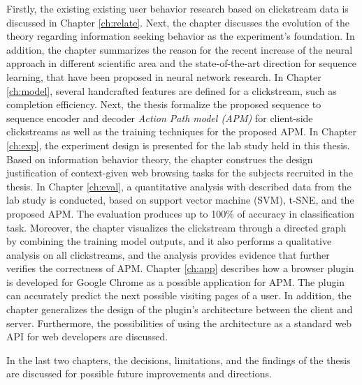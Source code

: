 Firstly, the existing existing user behavior research based on clickstream data is discussed in Chapter \ref{ch:relate}.
Next, the chapter discusses the evolution of the theory regarding information seeking behavior 
as the experiment's foundation.
In addition, the chapter summarizes the reason for the recent increase of the neural approach 
in different scientific area and the state-of-the-art direction for sequence learning, 
that have been proposed in neural network research.
In Chapter \ref{ch:model}, several handcrafted features are defined for a clickstream,
such as completion efficiency. Next, the thesis
formalize the proposed sequence to sequence encoder and decoder \emph{Action Path model (APM)} 
for client-side clickstreams as well as the training techniques for the proposed APM.
In Chapter \ref{ch:exp}, the experiment design is presented for the lab study held in this thesis.
Based on information behavior theory, the chapter construes the design justification 
of context-given web browsing tasks for the subjects recruited in the thesis.
In Chapter \ref{ch:eval},
a quantitative analysis with described data from the lab study is conducted, based on support
vector machine (SVM), t-SNE, and the proposed APM.
The evaluation produces up to 100\% of accuracy in classification task.
Moreover, the chapter visualizes the clickstream through a directed graph 
by combining the training model outputs,
and it also performs a qualitative analysis on all clickstreams, 
and the analysis provides evidence that further verifies the correctness of APM.
Chapter \ref{ch:app} describes how a browser plugin is developed
for Google Chrome as a possible application for APM. The plugin can accurately predict 
the next possible visiting pages of a user. 
In addition, the chapter generalizes the design of the plugin's architecture between the client and server.
Furthermore, the possibilities of using the architecture as a standard web API 
for web developers are discussed.

In the last two chapters, the decisions, limitations, and the findings of the thesis
are discussed for possible future improvements and directions.
\cleardoublepage